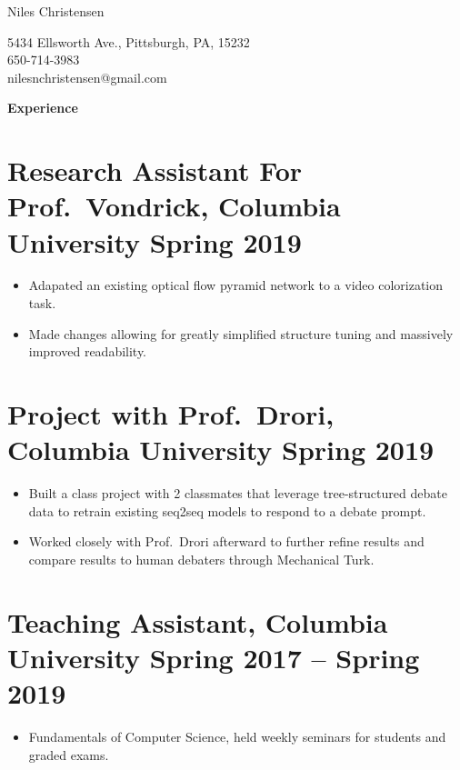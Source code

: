 \documentclass{article}
\newenvironment{tightcenter}{%
  \setlength\topsep{0pt}
  \setlength\parskip{0pt}
  \begin{center}
}{%
  \end{center}
}
\begin{document}
\begin{tightcenter}
\begin{Large}Niles Christensen\\
\end{Large}
\begin{small}
5434 Ellsworth Ave., Pittsburgh, PA, 15232\\
650-714-3983\\
nilesnchristensen@gmail.com
\end{small}
\end{tightcenter}

\noindent
\large{\textbf{Experience}}

\section*{\textbf{Research Assistant For Prof.\ Vondrick, Columbia University \hfill	Spring 2019}}
\begin{itemize}[noitemsep]
    \item Adapated an existing optical flow pyramid network to a video colorization task.
    \item Made changes allowing for greatly simplified structure tuning and massively improved readability.
\end{itemize}

\section*{\textbf{Project with Prof.\ Drori, Columbia University \hfill Spring 2019}}
\begin{itemize}[noitemsep]
  \item Built a class project with 2 classmates that leverage tree-structured debate data to retrain existing seq2seq models to respond to a debate prompt.
  \item Worked closely with Prof.\ Drori afterward to further refine results and compare results to human debaters through Mechanical Turk.
\end{itemize}

\section*{\textbf{Teaching Assistant, Columbia University \hfill	Spring 2017 -- Spring 2019 }}
\begin{itemize}
    \item Fundamentals of Computer Science, held weekly seminars for students and graded exams.
\end{itemize}
\end{document}
